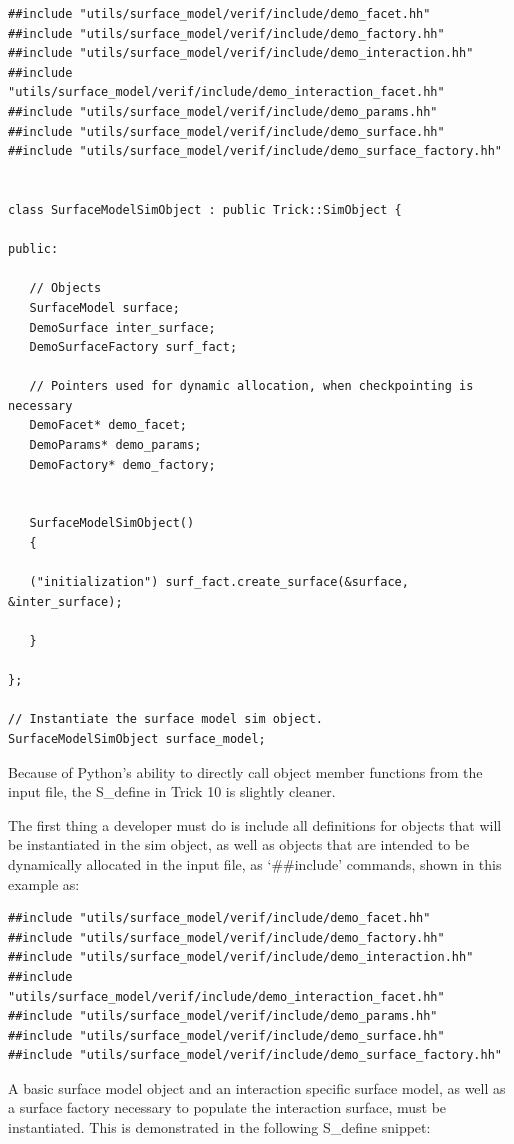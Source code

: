\begin{verbatim}
##include "utils/surface_model/verif/include/demo_facet.hh"
##include "utils/surface_model/verif/include/demo_factory.hh"
##include "utils/surface_model/verif/include/demo_interaction.hh"
##include "utils/surface_model/verif/include/demo_interaction_facet.hh"
##include "utils/surface_model/verif/include/demo_params.hh"
##include "utils/surface_model/verif/include/demo_surface.hh"
##include "utils/surface_model/verif/include/demo_surface_factory.hh"


class SurfaceModelSimObject : public Trick::SimObject {

public:

   // Objects
   SurfaceModel surface;
   DemoSurface inter_surface;
   DemoSurfaceFactory surf_fact;

   // Pointers used for dynamic allocation, when checkpointing is necessary
   DemoFacet* demo_facet; 
   DemoParams* demo_params;
   DemoFactory* demo_factory;


   SurfaceModelSimObject() 
   {
      
   ("initialization") surf_fact.create_surface(&surface, &inter_surface);

   }

};

// Instantiate the surface model sim object.
SurfaceModelSimObject surface_model;
\end{verbatim}

Because of Python's ability to directly call object member functions from the input file, the S\_define
in Trick 10 is slightly cleaner.

The first thing a developer must do is include all definitions for objects that will be instantiated
in the sim object, as well as objects that are intended to be dynamically allocated in the input file,
as `\#\#include' commands, shown in this example as:

\begin{verbatim}
##include "utils/surface_model/verif/include/demo_facet.hh"
##include "utils/surface_model/verif/include/demo_factory.hh"
##include "utils/surface_model/verif/include/demo_interaction.hh"
##include "utils/surface_model/verif/include/demo_interaction_facet.hh"
##include "utils/surface_model/verif/include/demo_params.hh"
##include "utils/surface_model/verif/include/demo_surface.hh"
##include "utils/surface_model/verif/include/demo_surface_factory.hh"
\end{verbatim}

A basic surface model object and an interaction specific surface model, as well
as a surface factory necessary to populate the interaction surface, must be instantiated.
This is demonstrated in the following S\_define snippet:

